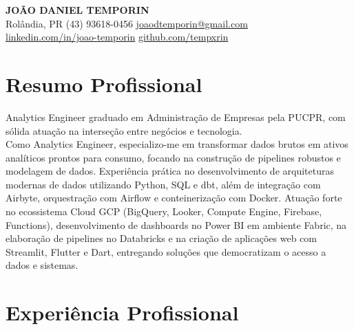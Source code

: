 \documentclass[a4paper,10pt]{article}
\begin{document}
\begin{center}
    {\LARGE \textbf{JOÃO DANIEL TEMPORIN}} 
    \\ [0.1cm]
    Rolândia, PR
    {\textbullet}
    (43) 93618-0456 
    {\textbullet}
    \href{mailto:joaodtemporin@gmail.com}{joaodtemporin@gmail.com}
    \\ [0.05cm]
    \href{https://linkedin.com/in/joao-temporin/}{linkedin.com/in/joao-temporin} 
    {\textbullet}
    \href{https://github.com/tempxrin}{github.com/tempxrin}
\end{center}

\section{Resumo Profissional}
    Analytics Engineer graduado em Administração de Empresas pela PUCPR, com sólida atuação na interseção entre negócios e tecnologia. 
    \\ Como Analytics Engineer, especializo-me em transformar dados brutos em ativos analíticos prontos para consumo, focando na construção de pipelines robustos e modelagem de dados. Experiência prática no desenvolvimento de arquiteturas modernas de dados utilizando Python, SQL e dbt, além de integração com Airbyte, orquestração com Airflow e conteinerização com Docker. Atuação forte no ecossistema Cloud GCP (BigQuery, Looker, Compute Engine, Firebase, Functions), desenvolvimento de dashboards no Power BI em ambiente Fabric, na elaboração de pipelines no Databricks e na criação de aplicações web com Streamlit, Flutter e Dart, entregando soluções que democratizam o acesso a dados e sistemas.


\section{Experiência Profissional}
\end{document}
